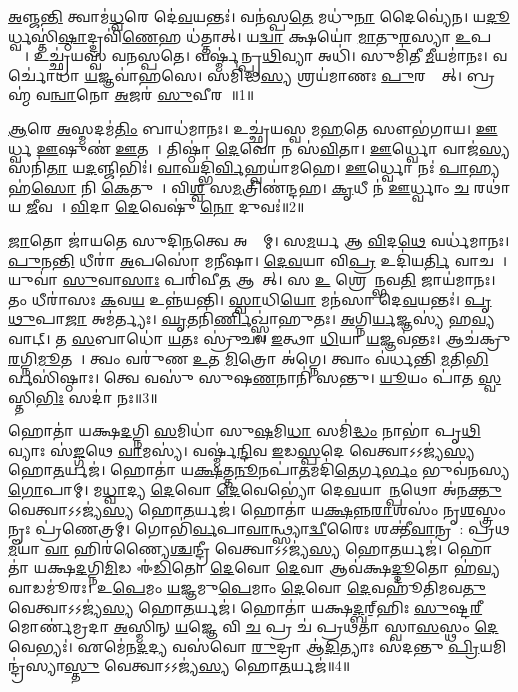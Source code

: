 \ul{𑌅}𑌞𑍍𑌜\ul{𑌨𑍍𑌤𑌿} 𑌤𑍍𑌵𑌾𑌮॑\ul{𑌧𑍍𑌵}𑌰𑍇 𑌦𑍇॑\ul{𑌵}𑌯𑌨𑍍𑌤𑌃॑।
𑌵𑌨॑𑌸𑍍𑌪\ul{𑌤𑍇} 𑌮𑌧𑍁॑\ul{𑌨𑌾} 𑌦𑍈𑌵𑍍𑌯𑍇॑𑌨।
𑌯\ul{𑌦𑍂}𑌰𑍍𑌧𑍍𑌵𑌸𑍍𑌤𑌿॑\ul{𑌷𑍍𑌠𑌾}𑌦𑍍𑌦𑍍𑌰𑌵𑌿॑\ul{𑌣𑍇}𑌹 𑌧॑𑌤𑍍𑌤𑌾𑌤𑍍।
𑌯\ul{𑌦𑍍𑌵𑌾} 𑌕𑍍𑌷𑌯𑍋॑ \ul{𑌮𑌾}𑌤𑍁\ul{𑌰}𑌸𑍍𑌯𑌾 \ul{𑌉}𑌪𑌸𑍍𑌥𑍇᳚।
𑌉𑌚𑍍𑌛𑍍𑌰॑𑌯𑌸𑍍𑌵 𑌵𑌨𑌸𑍍𑌪𑌤𑍇।
𑌵𑌰𑍍𑌷𑍍𑌮॑𑌨𑍍𑌪𑍃\ul{𑌥𑌿}𑌵𑍍𑌯𑌾 𑌅𑌧𑌿॑।
𑌸𑍁𑌮𑌿॑𑌤𑍀 \ul{𑌮𑍀}𑌯𑌮𑌾॑𑌨𑌃।
𑌵𑌰𑍍𑌚𑍋॑𑌧𑌾 \ul{𑌯}𑌜𑍍𑌞𑌵𑌾॑𑌹𑌸𑍇।
𑌸𑌮𑌿॑𑌦𑍍𑌧\ul{𑌸𑍍𑌯} 𑌶𑍍𑌰𑌯॑𑌮𑌾𑌣𑌃 \ul{𑌪𑍁}𑌰𑌸𑍍𑌤𑌾᳚𑌤𑍍।
𑌬𑍍𑌰𑌹𑍍𑌮॑ 𑌵\ul{𑌨𑍍𑌵𑌾}𑌨𑍋 \ul{𑌅}𑌜𑌰॑ \ul{𑌸𑍁}𑌵𑍀𑌰𑌮𑍍᳚॥1॥

\ul{𑌆}𑌰𑍇 \ul{𑌅}𑌸𑍍𑌮𑌦𑌮॑\ul{𑌤𑌿𑌂} 𑌬𑌾𑌧॑𑌮𑌾𑌨𑌃।
𑌉𑌚𑍍𑌛𑍍𑌰॑𑌯𑌸𑍍𑌵 𑌮\ul{𑌹}𑌤𑍇 𑌸𑍗𑌭॑𑌗𑌾𑌯।
\ul{𑌊}𑌰𑍍𑌧𑍍𑌵 \ul{𑌊}𑌷𑍁𑌣॑ \ul{𑌊}𑌤𑌯𑍇᳚।
𑌤𑌿𑌷𑍍𑌠𑌾॑ \ul{𑌦𑍇}𑌵𑍋 𑌨 𑌸॑\ul{𑌵𑌿}𑌤𑌾।
\ul{𑌊}𑌰𑍍𑌧𑍍𑌵𑍋 𑌵𑌾𑌜॑\ul{𑌸𑍍𑌯} 𑌸𑌨𑌿॑\ul{𑌤𑌾} 𑌯\ul{𑌦}𑌞𑍍𑌜𑌿𑌭𑌿𑌃॑।
\ul{𑌵𑌾}𑌘𑌦𑍍𑌭𑌿॑\ul{𑌰𑍍𑌵𑌿}𑌹𑍍𑌵𑌯𑌾॑𑌮𑌹𑍇।
\ul{𑌊}𑌰𑍍𑌧𑍍𑌵𑍋 𑌨𑌃॑ \ul{𑌪𑌾}𑌹𑍍𑌯𑌹॑\ul{𑌸𑍋} 𑌨𑌿 \ul{𑌕𑍇}𑌤𑍁𑌨𑌾᳚।
𑌵𑌿\ul{𑌶𑍍𑌵}\ul{} 𑌸\ul{𑌮}𑌤𑍍𑌰𑌿𑌣॑𑌨𑍍𑌦𑌹।
\ul{𑌕𑍃}𑌧𑍀 𑌨॑ \ul{𑌊}𑌰𑍍𑌧𑍍𑌵𑌾𑌂 \ul{𑌚} 𑌰𑌥𑌾॑𑌯 \ul{𑌜𑍀}𑌵𑌸𑍇᳚।
\ul{𑌵𑌿}𑌦𑌾 \ul{𑌦𑍇}𑌵𑍇𑌷𑍁॑ \ul{𑌨𑍋} 𑌦𑍁𑌵𑌃॑॥2॥

\ul{𑌜𑌾}𑌤𑍋 𑌜𑌾॑𑌯𑌤𑍇 𑌸𑍁𑌦𑌿\ul{𑌨}𑌤𑍍𑌵𑍇 𑌅𑌹𑍍𑌨𑌾᳚𑌮𑍍।
𑌸\ul{𑌮}𑌰𑍍𑌯 𑌆 \ul{𑌵𑌿}𑌦\ul{𑌥𑍇} 𑌵𑌰𑍍𑌧॑𑌮𑌾𑌨𑌃।
\ul{𑌪𑍁}𑌨\ul{𑌨𑍍𑌤𑌿} 𑌧𑍀𑌰𑌾॑ \ul{𑌅}𑌪𑌸𑍋॑ 𑌮\ul{𑌨𑍀}𑌷𑌾।
\ul{𑌦𑍇}\ul{𑌵}𑌯𑌾 𑌵𑌿\ul{𑌪𑍍𑌰} 𑌉𑌦𑌿॑𑌯\ul{𑌰𑍍𑌤𑌿} 𑌵𑌾𑌚𑌮𑍍᳚।
𑌯𑍁𑌵𑌾॑ \ul{𑌸𑍁}𑌵𑌾\ul{𑌸𑌾𑌃} 𑌪𑌰𑌿॑𑌵𑍀\ul{𑌤} 𑌆𑌗𑌾᳚𑌤𑍍।
𑌸 \ul{𑌉} 𑌶𑍍𑌰𑍇𑌯𑌾᳚𑌨𑍍𑌭𑌵\ul{𑌤𑌿} 𑌜𑌾𑌯॑𑌮𑌾𑌨𑌃।
𑌤𑌂 𑌧𑍀𑌰𑌾॑𑌸𑌃 \ul{𑌕}𑌵\ul{𑌯} 𑌉𑌨𑍍𑌨॑𑌯𑌨𑍍𑌤𑌿।
\ul{𑌸𑍍𑌵𑌾}𑌧𑌿\ul{𑌯𑍋} 𑌮𑌨॑𑌸𑌾 𑌦𑍇\ul{𑌵}𑌯𑌨𑍍𑌤𑌃॑।
\ul{𑌪𑍃}\ul{𑌥𑍁}𑌪𑌾\ul{𑌜𑌾} 𑌅𑌮॑𑌰𑍍𑌤𑍍𑌯𑌃।
\ul{𑌘𑍃}𑌤𑌨𑌿॑\ul{𑌰𑍍𑌣𑌿}𑌖𑍍𑌸𑍍𑌵𑌾॑𑌹𑍁𑌤𑌃।
\ul{𑌅}𑌗𑍍𑌨𑌿\ul{𑌰𑍍𑌯}𑌜𑍍𑌞𑌸𑍍𑌯॑ 𑌹\ul{𑌵𑍍𑌯}𑌵𑌾𑌟𑍍।
𑌤 \ul{𑌸}𑌬𑌾𑌧𑍋॑ \ul{𑌯}𑌤𑌃 𑌸𑍍𑌰𑍁॑𑌚𑌃।
\ul{𑌇}𑌤𑍍𑌥𑌾 \ul{𑌧𑌿}𑌯𑌾 \ul{𑌯}𑌜𑍍𑌞𑌵॑𑌨𑍍𑌤𑌃।
𑌆𑌚॑𑌕𑍍𑌰𑍁\ul{𑌰}𑌗𑍍𑌨𑌿\ul{𑌮𑍂}𑌤𑌯𑍇᳚।
𑌤𑍍𑌵𑌂 𑌵𑌰𑍁॑𑌣 \ul{𑌉}𑌤 \ul{𑌮𑌿}𑌤𑍍𑌰𑍋 𑌅॑𑌗𑍍𑌨𑍇।
𑌤𑍍𑌵𑌾𑌂 𑌵॑𑌰𑍍𑌧𑌨𑍍𑌤𑌿 \ul{𑌮}𑌤𑌿\ul{𑌭𑌿}𑌰𑍍𑌵𑌸𑌿॑𑌷𑍍𑌠𑌾𑌃।
𑌤𑍍𑌵𑍇 𑌵𑌸𑍁॑ 𑌸𑍁𑌷\ul{𑌣}𑌨𑌾𑌨𑌿॑ 𑌸𑌨𑍍𑌤𑍁।
\ul{𑌯𑍂}𑌯𑌂 𑌪𑌾॑𑌤 \ul{𑌸𑍍𑌵}𑌸𑍍𑌤𑌿\ul{𑌭𑌿𑌃} 𑌸𑌦𑌾॑ 𑌨𑌃॥3॥\anuvakamend[\ul{𑌸𑍁}𑌵𑍀\ul{𑌰𑌂} 𑌦𑍁\ul{𑌵𑌃} 𑌸𑍍𑌵𑌾॑𑌹𑍁\ul{𑌤𑍋}\-𑌽𑌷𑍍𑌟𑍗 𑌚॑]

𑌹𑍋𑌤𑌾॑ 𑌯𑌕𑍍𑌷\ul{𑌦}𑌗𑍍𑌨𑌿 \ul{𑌸}𑌮𑌿𑌧𑌾॑ 𑌸𑍁\ul{𑌷}𑌮𑌿\ul{𑌧𑌾} 𑌸𑌮𑌿॑\ul{𑌦𑍍𑌧𑌂} 𑌨𑌾𑌭𑌾॑ 𑌪𑍃\ul{𑌥𑌿}𑌵𑍍𑌯𑌾𑌃 𑌸॑\ul{𑌙𑍍𑌗}𑌥𑍇 \ul{𑌵𑌾}𑌮𑌸𑍍𑌯॑।
𑌵𑌰𑍍𑌷𑍍𑌮॑\ul{𑌨𑍍𑌦𑌿}𑌵 \ul{𑌇}𑌡\ul{𑌸𑍍𑌪}𑌦𑍇 𑌵𑍇𑌤𑍍𑌵𑌾𑌽𑌽𑌜𑍍𑌯॑\ul{𑌸𑍍𑌯} 𑌹𑍋\ul{𑌤}𑌰𑍍𑌯𑌜॑।
𑌹𑍋𑌤𑌾॑ 𑌯\ul{𑌕𑍍𑌷}𑌤𑍍𑌤\ul{𑌨𑍂}𑌨𑌪𑌾॑\ul{𑌤}𑌮𑌦𑌿॑\ul{𑌤𑍇}𑌰𑍍𑌗\ul{𑌰𑍍𑌭𑌂} 𑌭𑍁𑌵॑𑌨𑌸𑍍𑌯 \ul{𑌗𑍋}𑌪𑌾𑌮𑍍।
𑌮\ul{𑌧𑍍𑌵𑌾}𑌦𑍍𑌯 \ul{𑌦𑍇}𑌵𑍋 \ul{𑌦𑍇}𑌵𑍇𑌭𑍍𑌯𑍋॑ 𑌦𑍇\ul{𑌵}𑌯𑌾𑌨𑌾᳚\ul{𑌨𑍍𑌪}𑌥𑍋 𑌅॑𑌨\ul{𑌕𑍍𑌤𑍁} 𑌵𑍇𑌤𑍍𑌵𑌾𑌽𑌽𑌜𑍍𑌯॑\ul{𑌸𑍍𑌯} 𑌹𑍋\ul{𑌤}𑌰𑍍𑌯𑌜॑।
𑌹𑍋𑌤𑌾॑ 𑌯\ul{𑌕𑍍𑌷}𑌨𑍍𑌨\ul{𑌰𑌾}𑌶𑌸𑌂॑ 𑌨𑍃\ul{𑌶}𑌸𑍍𑌤𑍍𑌰𑌂 𑌨𑍄𑌃 𑌪𑍍𑌰॑𑌣𑍇𑌤𑍍𑌰𑌮𑍍।
𑌗𑍋𑌭𑌿॑\ul{𑌰𑍍𑌵}𑌪𑌾\ul{𑌵𑌾}𑌨𑍍𑌥𑍍𑌸𑍍𑌯𑌾\ul{𑌦𑍍𑌵𑍀}𑌰𑍈𑌃 𑌶𑌕𑍍𑌤𑍀॑\ul{𑌵𑌾}𑌨𑍍𑌰𑌥𑍈᳚: 𑌪𑍍𑌰𑌥\ul{𑌮}𑌯𑌾 \ul{𑌵𑌾} 𑌹𑌿𑌰॑𑌣𑍍𑌯𑍈\ul{𑌶𑍍𑌚}𑌨𑍍𑌦𑍍𑌰𑍀 𑌵𑍇𑌤𑍍𑌵𑌾𑌽𑌽𑌜𑍍𑌯॑\ul{𑌸𑍍𑌯} 𑌹𑍋\ul{𑌤}𑌰𑍍𑌯𑌜॑।
𑌹𑍋𑌤𑌾॑ 𑌯𑌕𑍍𑌷\ul{𑌦}𑌗𑍍𑌨𑌿\ul{𑌮𑌿}𑌡 𑌈॑\ul{𑌡𑌿}𑌤𑍋 \ul{𑌦𑍇}𑌵𑍋 \ul{𑌦𑍇}𑌵𑌾 𑌆𑌵॑𑌕𑍍𑌷\ul{𑌦𑍍𑌦𑍂}𑌤𑍋 𑌹॑\ul{𑌵𑍍𑌯}𑌵𑌾𑌡𑌮𑍂॑𑌰𑌃।
𑌉\ul{𑌪𑍇}𑌮𑌂 \ul{𑌯}𑌜𑍍𑌞𑌮𑍁\ul{𑌪𑍇}𑌮𑌾𑌂 \ul{𑌦𑍇}𑌵𑍋 \ul{𑌦𑍇}𑌵𑌹𑍂॑𑌤𑌿𑌮𑌵\ul{𑌤𑍁} 𑌵𑍇𑌤𑍍𑌵𑌾𑌽𑌽𑌜𑍍𑌯॑\ul{𑌸𑍍𑌯} 𑌹𑍋\ul{𑌤}𑌰𑍍𑌯𑌜॑।
𑌹𑍋𑌤𑌾॑ 𑌯𑌕𑍍𑌷\ul{𑌦𑍍𑌬}𑌰𑍍‌॒\mbox{}𑌹𑌿𑌃 \ul{𑌸𑍁}𑌷𑍍𑌟\ul{𑌰𑍀}𑌮𑍋𑌰𑍍𑌣॑𑌮𑍍𑌰𑌦𑌾 \ul{𑌅}𑌸𑍍𑌮𑌿𑌨𑍍 \ul{𑌯}𑌜𑍍𑌞𑍇 𑌵𑌿 \ul{𑌚} 𑌪𑍍𑌰 𑌚॑ 𑌪𑍍𑌰𑌥𑌤𑌾 𑌸𑍍𑌵𑌾\ul{𑌸}𑌸𑍍𑌥𑌂 \ul{𑌦𑍇}𑌵𑍇𑌭𑍍𑌯𑌃॑।
𑌏𑌮𑍇॑𑌨\ul{𑌦}𑌦𑍍𑌯 𑌵𑌸॑𑌵𑍋 \ul{𑌰𑍁}𑌦𑍍𑌰𑌾 𑌆॑\ul{𑌦𑌿}𑌤𑍍𑌯𑌾𑌃 𑌸॑𑌦𑌨𑍍𑌤𑍁 \ul{𑌪𑍍𑌰𑌿}𑌯𑌮𑌿𑌨𑍍𑌦𑍍𑌰॑𑌸𑍍𑌯𑌾\ul{𑌸𑍍𑌤𑍁} 𑌵𑍇𑌤𑍍𑌵𑌾𑌽𑌽𑌜𑍍𑌯॑\ul{𑌸𑍍𑌯} 𑌹𑍋\ul{𑌤}𑌰𑍍𑌯𑌜॑॥4॥


